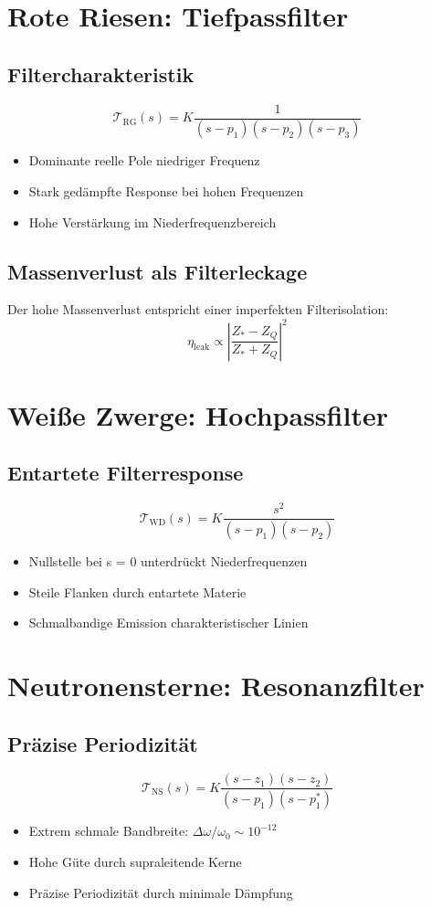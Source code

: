 \section{Rote Riesen: Tiefpassfilter}

\subsection{Filtercharakteristik}
\[
\mathcal{T}_{\text{RG}}(s) = K\frac{1}{(s - p_1)(s - p_2)(s - p_3)}
\]
\begin{itemize}
\item Dominante reelle Pole niedriger Frequenz
\item Stark gedämpfte Response bei hohen Frequenzen
\item Hohe Verstärkung im Niederfrequenzbereich
\end{itemize}

\subsection{Massenverlust als Filterleckage}
Der hohe Massenverlust entspricht einer imperfekten Filterisolation:
\[
\eta_{\text{leak}} \propto \left|\frac{Z_* - Z_Q}{Z_* + Z_Q}\right|^2
\]

\section{Weiße Zwerge: Hochpassfilter}

\subsection{Entartete Filterresponse}
\[
\mathcal{T}_{\text{WD}}(s) = K\frac{s^2}{(s - p_1)(s - p_2)}
\]
\begin{itemize}
\item Nullstelle bei s = 0 unterdrückt Niederfrequenzen
\item Steile Flanken durch entartete Materie
\item Schmalbandige Emission charakteristischer Linien
\end{itemize}

\section{Neutronensterne: Resonanzfilter}

\subsection{Präzise Periodizität}
\[
\mathcal{T}_{\text{NS}}(s) = K\frac{(s - z_1)(s - z_2)}{(s - p_1)(s - p_1^*)}
\]
\begin{itemize}
\item Extrem schmale Bandbreite: $\Delta\omega/\omega_0 \sim 10^{-12}$
\item Hohe Güte durch supraleitende Kerne
\item Präzise Periodizität durch minimale Dämpfung
\end{itemize}

